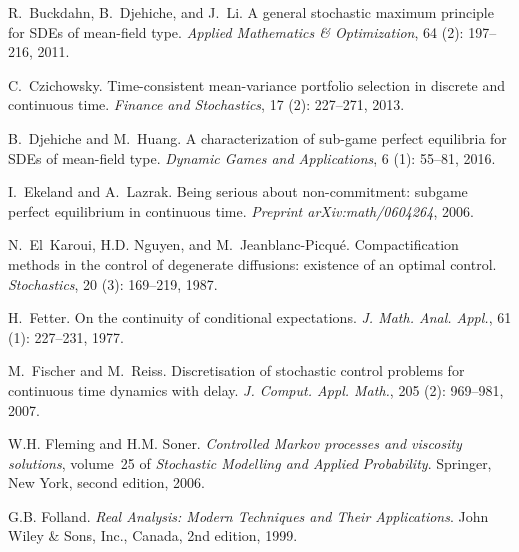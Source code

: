 \documentclass[12pt]{article}
\theoremstyle{named}
\numberwithin{equation}{section}
\begin{document}
\begin{thebibliography}{31}
R.~Buckdahn, B.~Djehiche, and J.~Li.
\newblock A general stochastic maximum principle for {SDE}s of mean-field type.
\newblock \emph{Applied Mathematics \& Optimization}, 64 (2):
  197--216, 2011.

C.~Czichowsky.
\newblock Time-consistent mean-variance portfolio selection in discrete and
  continuous time.
\newblock \emph{Finance and Stochastics}, 17 (2): 227--271,
  2013.

B.~Djehiche and M.~Huang.
\newblock A characterization of sub-game perfect equilibria for {SDE}s of
  mean-field type.
\newblock \emph{Dynamic Games and Applications}, 6 (1):
  55--81, 2016.

I.~Ekeland and A.~Lazrak.
\newblock Being serious about non-commitment: subgame perfect equilibrium in
  continuous time.
\newblock \emph{Preprint arXiv:math/0604264}, 2006.

N.~{{E}l~Karoui}, H.D. Nguyen, and M.~Jeanblanc-Picqu\'{e}.
\newblock Compactification methods in the control of degenerate diffusions:
  existence of an optimal control.
\newblock \emph{Stochastics}, 20 (3): 169--219, 1987.

H.~Fetter.
\newblock On the continuity of conditional expectations.
\newblock \emph{J. Math. Anal. Appl.}, 61 (1): 227--231,
  1977.

M.~Fischer and M.~Reiss.
\newblock Discretisation of stochastic control problems for continuous time
  dynamics with delay.
\newblock \emph{J. Comput. Appl. Math.}, 205 (2): 969--981,
  2007.

W.H. Fleming and H.M. Soner.
\newblock \emph{Controlled {M}arkov processes and viscosity solutions},
  volume~25 of \emph{Stochastic Modelling and Applied Probability}.
\newblock Springer, New York, second edition, 2006.

G.B. Folland.
\newblock \emph{Real Analysis: Modern Techniques and Their Applications}.
\newblock John Wiley \& Sons, Inc., Canada, 2nd edition, 1999.


\end{thebibliography}
\end{document}
